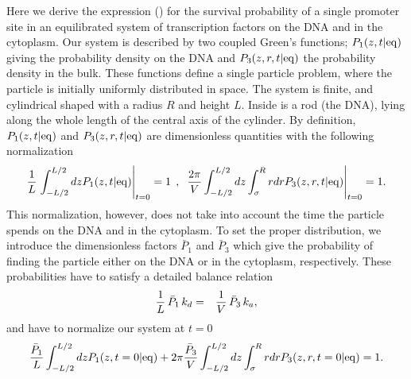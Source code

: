 Here we derive the expression () for the survival probability of a single promoter site in an equilibrated system of transcription factors on the DNA and in the cytoplasm. Our system is described by two coupled Green's functions; $P_1(z,t|{\rm eq})$ giving the probability density on the DNA and $P_3(z,r,t|{\rm eq})$ the probability density in the bulk. These functions define a single particle problem, where the particle is initially uniformly distributed in space. The system is finite, and cylindrical shaped with a radius $R$ and height $L$. Inside is a rod (the DNA), lying along the whole length of the central axis of the cylinder. By definition, $P_1(z,t|{\rm eq})$ and $P_3(z,r,t|{\rm eq})$ are dimensionless quantities with the following normalization
\begin{equation}
 \frac{1}{L} \left. \int_{-L/2}^{L/2} dz P_1(z,t|{\rm eq})\right|_{t=0} = 1 \:\: , \:\: \left. \frac{2\pi}{V} \int_{-L/2}^{L/2} dz \int_{\sigma}^{R} rdr P_3(z,r,t|{\rm eq})\right|_{t=0} = 1.
\end{equation}
This normalization, however, does not take into account the time the particle spends on the DNA and in the cytoplasm. To set the proper distribution, we introduce the dimensionless factors $\bar{P}_1$ and $\bar{P}_3$ which give the probability of finding the particle either on the DNA or in the cytoplasm, respectively. These probabilities have to satisfy a detailed balance relation 
\begin{eqnarray}
 \frac{1}{L} \, \bar{P}_1 \, k_d & = & \frac{1}{V} \, \bar{P}_3 \, k_a,
 \elabel{DB_init}
\end{eqnarray}
and have to normalize our system at $t=0$
\begin{equation}
 \frac{\bar{P}_1}{L} \int_{-L/2}^{L/2} dz P_1(z,t=0|{\rm eq }) + 2\pi \frac{\bar{P}_3}{V} \int_{-L/2}^{L/2}dz \int_{\sigma}^{R}rdr P_3(z,r,t=0|{\rm eq}) = 1.
\end{equation}

